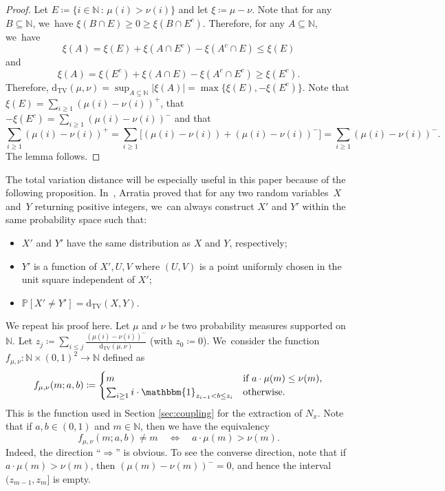 \documentclass[JEP,XML,SOM,Unicode,published]{cedram}
\newcommand{\NN}{\mathbb{N}}
\newcommand{\PP}{\mathbb{P}}
\newcommand{\one}{\mathbbm{1}}
\newcommand{\dtv}{\mathrm{d}_{\mathrm{TV}}}
\newcommand{\bg}{\big}
\theoremstyle{plain}
\theoremstyle{definition}
\begin{document}
\begin{proof}
Let $E \coloneqq \{i \in \NN \, : \, \mu(i) > \nu(i)\}$ and let $\xi\coloneqq \mu - \nu$. Note that for any $B\subseteq \NN$, we~have $\xi(B\cap E) \ge 0 \ge \xi(B\cap E^c)$. Therefore, for any $A \subseteq \NN$, we~have
\[
\xi(A) = \xi(E) + \xi(A \cap E^c) - \xi(A^c \cap E) \le \xi(E)
\]
and
\[
\xi(A) = \xi(E^c) + \xi(A \cap E) - \xi(A^c \cap E^c) \ge \xi(E^c).
\]
Therefore, $\dtv(\mu, \nu) = \sup_{A \subseteq \NN} |\xi(A)| = \max\{\xi(E), -\xi(E^c)\}$. Note that $\xi(E) = \sum_{i \ge 1} (\mu(i) - \nu(i))^+$, that $-\xi(E^c) = \sum_{i \ge 1} (\mu(i) - \nu(i))^-$ and that
\[
\sum_{i \ge 1} (\mu(i) - \nu(i))^+ = \sum_{i \ge 1} \bg[(\mu(i) - \nu(i)) + (\mu(i) - \nu(i))^-\bg] = \sum_{i \ge 1} (\mu(i) - \nu(i))^-.
\]
The lemma follows.
\end{proof}

The total variation distance will be especially useful in this paper because of the following proposition. In~\cite[\S 3.8]{Arratia02}, Arratia proved that for any two random variables~$X$ and~$Y$ returning positive integers, we~can always construct $X'$ and $Y'$ within the same probability space such that:
\begin{itemize}
\item $X'$ and $Y'$ have the same distribution as $X$ and $Y$, respectively;

\item $Y'$ is a function of $X', U, V$ where $(U, V)$ is a point uniformly chosen in the unit square independent of $X'$;

\item $\PP[X' \ne Y'] = \dtv(X, Y)$.
\end{itemize}
We repeat his proof here. Let $\mu$ and $\nu$ be two probability measures supported on $\NN$. Let $z_j \coloneqq \sum_{i \le j} \frac{(\mu(i) - \nu(i))^-}{\dtv(\mu, \nu)}$ (with $z_0 \coloneqq 0$). We~consider the function $f_{\mu, \nu}\colon \NN \times (0, 1)^2 \to \NN$ defined as
\[
f_{\mu, \nu}(m; a, b) \coloneqq \begin{cases}
m &\text{if $a \cdot \mu(m) \le \nu(m)$,} \\
\sum_{i \ge 1} i \cdot \one_{z_{i-1} < b \le z_i} &\text{otherwise.}
\end{cases}
\]
This is the function used in Section \ref{sec:coupling} for the extraction of $N_x$.
Note that if $a,b\in(0,1)$ and $m\in\NN$, then we have the equivalency
\begin{equation}
\label{eq:f TV property}
f_{\mu, \nu}(m; a, b) \ne m\quad\iff\quad a\cdot \mu(m) > \nu(m).
\end{equation}
Indeed, the direction ``$\Rightarrow$'' is obvious. To see the converse direction, note that if \hbox{$a\cdot\mu(m)>\nu(m)$}, then $(\mu(m)-\nu(m))^-=0$, and hence the interval $(z_{m-1},z_m]$ is empty.
\end{document}

